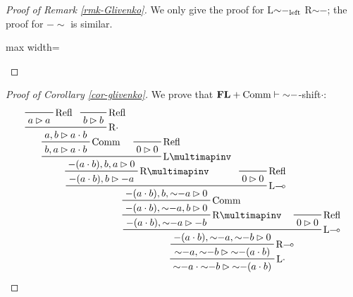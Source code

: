 \documentclass[runningheads]{llncs}
\newcommand{\FL}{\mathbf{FL}}
\begin{document}
\begin{proof}[Proof of Remark \ref{rmk-Glivenko}]
    We only give the proof for L${\sim}{-}_\textnormal{left}$ R${\sim}{-}$; the proof for ${-}{\sim}$ is similar.

    \begin{adjustbox}{max width=\textwidth}
    \quad\quad
    \qedhere
    \end{adjustbox}
\end{proof}

\begin{proof}[Proof of Corollary \ref{cor-glivenko}]
    We prove that $\FL+\textnormal{Comm}\vdash{\sim}{-}$-shift$\cdot$:
    \[
    \prftree[r]{\textnormal{L$\cdot$}}{
        \prftree[r]{\textnormal{R$\multimap$}}{
            \prftree[r]{\textnormal{L$\multimap$}}{
                \prftree[r]{\textnormal{R$\multimapinv$}}{
                    \prftree[r]{\textnormal{Comm}}{
                    \prftree[r]{\textnormal{L$\multimap$}}{
                        \prftree[r]{\textnormal{R$\multimapinv$}}{
                            \prftree[r]{\textnormal{L$\multimapinv$}}{
                            \prftree[r]{\textnormal{Comm}}{
                                \prftree[r]{\textnormal{R$\cdot$}}{
                                    \prftree[r]{Refl}{a\rhd a}
                                }{
                                    \prftree[r]{Refl}{b\rhd b}
                                }{a,b\rhd a\cdot b}
                                }{b,a\rhd a\cdot b}
                            }{
                                \prftree[r]{\textnormal{Refl}}{0\rhd 0}
                            }{{-}(a\cdot b),b,a\rhd 0}
                        }{{-}(a\cdot b),b\rhd {-}a}
                    }{
                        \prftree[r]{\textnormal{Refl}}{0\rhd 0}
                    }{{-}(a\cdot b),b, {\sim}{-}a\rhd 0}
                    }{{-}(a\cdot b), {\sim}{-}a,b\rhd 0}
                }{{-}(a\cdot b), {\sim}{-}a\rhd {-}b}
            }{
                \prftree[r]{\textnormal{Refl}}{0\rhd 0}
            }{{-}(a\cdot b),{\sim}{-}a, {\sim}{-}b\rhd 0}
        }{{\sim}{-}a, {\sim}{-}b\rhd {\sim}{-}(a\cdot b)}
    }{{\sim}{-}a\cdot {\sim}{-}b\rhd {\sim}{-}(a\cdot b)}
    \qedhere
    \]
\end{proof}
\end{document}
